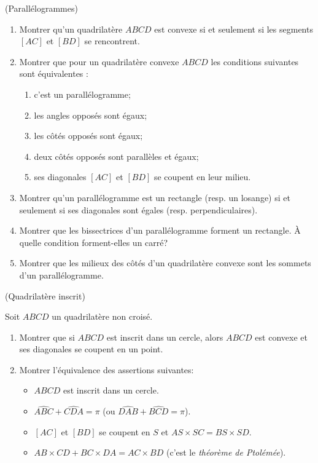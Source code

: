 \documentclass[a4paper,11pt,reqno]{amsart}
\begin{document}
\begin{exo} (Parallélogrammes) %

  \begin{enumerate}
    \item Montrer qu'un quadrilatère $ABCD$ est convexe si et seulement si les segments $[AC]$ et $[BD]$ se rencontrent.
    \item Montrer que pour un quadrilatère convexe $ABCD$ les conditions suivantes sont équivalentes :
    \begin{enumerate}
      \item c'est un parallélogramme;
      \item les angles opposés sont égaux;
      \item les côtés opposés sont égaux;
      \item deux côtés opposés sont parallèles et égaux;
      \item ses diagonales $[AC]$ et $[BD]$ se coupent en leur milieu.
    \end{enumerate}
    \item Montrer qu'un parallélogramme est un rectangle (resp. un losange) si et seulement si ses diagonales sont égales (resp. perpendiculaires).
    \item Montrer que les bissectrices d'un parallélogramme forment un rectangle. À quelle condition forment-elles un carré?
    \item Montrer que les milieux des côtés d'un quadrilatère convexe sont les sommets d'un parallélogramme.
  \end{enumerate}
\end{exo}

\begin{exo} (Quadrilatère inscrit)

    Soit $ABCD$ un quadrilatère non croisé.
    \begin{enumerate}
      \item Montrer que si $ABCD$ est inscrit dans un cercle, alors $ABCD$ est convexe et ses diagonales se coupent en un point.
      \item Montrer l'équivalence des assertions suivantes:
      \begin{itemize}
        \item $ABCD$ est inscrit dans un cercle.
        \item $\widehat{ABC}+\widehat{CDA} = \pi$ (ou $\widehat{DAB}+\widehat{BCD} = \pi$).
        \item $[AC]$ et $[BD]$ se coupent en $S$ et $AS \times SC = BS \times SD$.
        \item $AB\times CD + BC\times DA = AC\times BD$ (c'est le \emph{théorème de Ptolémée}).
      \end{itemize}
    \end{enumerate}
\end{exo}
\end{document}
